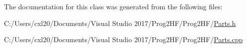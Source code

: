 The documentation for this class was generated from the following files\+:\begin{DoxyCompactItemize}
\item 
C\+:/\+Users/cxl20/\+Documents/\+Visual Studio 2017/\+Prog2\+H\+F/\+Prog2\+H\+F/\mbox{\hyperlink{_parts_8h}{Parts.\+h}}\item 
C\+:/\+Users/cxl20/\+Documents/\+Visual Studio 2017/\+Prog2\+H\+F/\+Prog2\+H\+F/\mbox{\hyperlink{_parts_8cpp}{Parts.\+cpp}}\end{DoxyCompactItemize}
